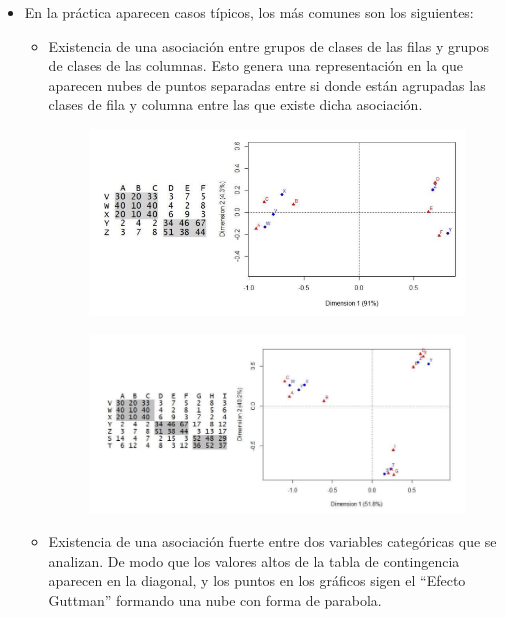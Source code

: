 \begin{itemize}
    \item En la práctica aparecen casos típicos, los más comunes son los siguientes:
    \begin{itemize}
        \item Existencia de una asociación entre grupos de clases de las filas y grupos de clases de las columnas. Esto genera una representación en la que aparecen nubes de puntos separadas entre si donde están agrupadas las clases de fila y columna entre las que existe dicha asociación.
        \begin{figure}[ht]
            \includegraphics[width=\textwidth]{assets/asociacion_gruopos1.png}
        \end{figure}
        \begin{figure}[ht]
            \includegraphics[width=\textwidth]{assets/asociacion_gruopos2.png}
        \end{figure}
        \newpage
        \vspace*{15mm}
        \item Existencia de una asociación fuerte entre dos variables categóricas que se analizan. De modo que los valores altos de la tabla de contingencia aparecen en la diagonal, y los puntos en los gráficos sigen el ``Efecto Guttman'' formando una nube con forma de parabola.
        \begin{figure}[ht]

\end{figure}
\end{itemize}
\end{itemize}
